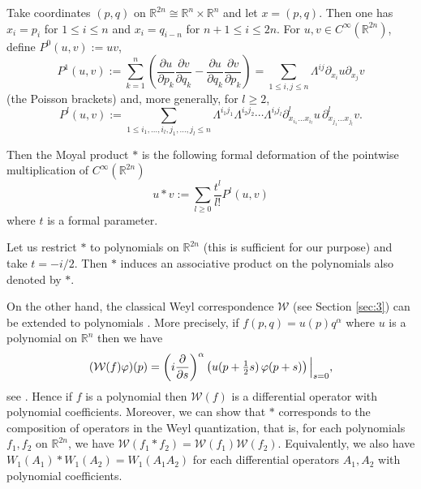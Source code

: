 \documentclass[12pt]{amsart}
\numberwithin{equation}{section}
\begin{document}
Take coordinates
$(p,q)$ on ${\mathbb R}^{2n}\cong  {\mathbb R}^{n}\times  {\mathbb R}^{n}$ and let
$x=(p,q)$. Then one has $x_i=p_i$ for $1\leq i \leq n$ and $x_i=q_{i-n}$ for $n+1\leq i\leq 2n$. For $u,v\in C^{\infty}({\mathbb R}^{2n})$, define $P^0(u,v):=uv$,
\begin{equation*}P^1(u,v):=\sum_{k=1}^n\left( \frac{\partial u}{\partial p_k}
\frac{\partial v}{\partial q_k}-\frac{\partial u}{\partial q_k}
\frac{\partial v}{\partial p_k}\right)=\sum_{1\leq i,j\leq n}\Lambda^{ij}{\partial_{x_i}}u
{\partial_{x_j}}v \end{equation*}
(the Poisson brackets) and, more generally, for $l\geq 2$,
\begin{equation*}P^l(u,v):=\sum_{1\leq i_1,\ldots, i_l,j_1,\ldots,j_l\leq n}
\Lambda^{i_1j_1}\Lambda^{i_2j_2}\cdots \Lambda^{i_lj_l}\partial^l_{x_{i_1}\ldots x_{i_l}}u \,\partial^l_{x_{j_1}\ldots x_{j_l}}v.\end{equation*}


Then the Moyal product $\ast$ is the following formal deformation of the pointwise multiplication of $C^{\infty}({\mathbb R}^{2n})$
\begin{equation*}u \ast v:=\sum_{l\geq 0}\frac{t^l}{l!}P^l(u,v)\end {equation*}
where $t$ is a formal parameter.


Let us restrict $\ast$ to polynomials on ${\mathbb R}^{2n}$ (this is sufficient for our purpose) and take $t=-i/2$.
Then $\ast$ induces an associative product on the polynomials also denoted by $\ast$. 

On the other hand, the classical Weyl correspondence ${\mathcal W}$ (see Section \ref{sec:3})
can be extended to polynomials \cite{Ho1}. More precisely, if $f(p,q)=u(p)q^{\alpha}$ where $u$ is a polynomial on ${\mathbb R}^n$ then we have
\begin{equation*}\label{eq:W} ({\mathcal W}(f)\varphi )(p)=\left(i\frac {\partial }{ \partial
s}\right)^{\alpha} \left( u(p+\tfrac{1}{2}s)\,\varphi (p+s) \right) \Bigl
\vert _{s=0},\end{equation*}  see \cite{Vo}.
Hence if $f$ is a polynomial then ${\mathcal W}(f)$ is a differential operator with polynomial coefficients. Moreover, we can show that $\ast$ corresponds to the composition of operators in the Weyl quantization, that is, for each polynomials $f_1,f_2$ on ${\mathbb R}^{2n}$, 
we have ${\mathcal W}(f_1\ast f_2)={\mathcal W}(f_1){\mathcal W}(f_2)$. Equivalently, 
we also have $W_1(A_1)\ast W_1(A_2)=W_1(A_1A_2)$ for each differential operators $A_1,A_2$ with polynomial coefficients.
\end{document}
